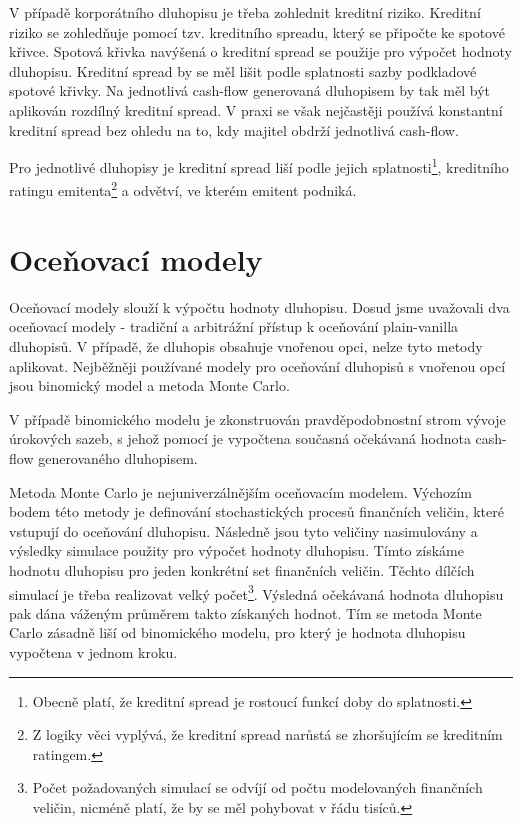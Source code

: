 \documentclass[a4paper]{book}
\begin{document}
V případě korporátního dluhopisu je třeba zohlednit kreditní riziko. Kreditní riziko se zohledňuje pomocí tzv. kreditního spreadu, který se připočte ke spotové křivce. Spotová křivka navýšená o kreditní spread se použije pro výpočet hodnoty dluhopisu. Kreditní spread by se měl lišit podle splatnosti sazby podkladové spotové křivky. Na jednotlivá cash-flow generovaná dluhopisem by tak měl být aplikován rozdílný kreditní spread. V praxi se však nejčastěji používá konstantní kreditní spread bez ohledu na to, kdy majitel obdrží jednotlivá cash-flow.

Pro jednotlivé dluhopisy je kreditní spread liší podle jejich splatnosti\footnote{Obecně platí, že kreditní spread je rostoucí funkcí doby do splatnosti.}, kreditního ratingu emitenta\footnote{Z logiky věci vyplývá, že kreditní spread narůstá se zhoršujícím se kreditním ratingem.} a odvětví, ve kterém emitent podniká.

\section{Oceňovací modely}

Oceňovací modely slouží k výpočtu hodnoty dluhopisu. Dosud jsme uvažovali dva oceňovací modely - tradiční a arbitrážní přístup k oceňování plain-vanilla dluhopisů. V případě, že dluhopis obsahuje vnořenou opci, nelze tyto metody aplikovat. Nejběžněji používané modely pro oceňování dluhopisů s vnořenou opcí jsou binomický model a metoda Monte Carlo.

V případě binomického modelu je zkonstruován pravděpodobnostní strom vývoje úrokových sazeb, s jehož pomocí je vypočtena současná očekávaná hodnota cash-flow generovaného dluhopisem.

Metoda Monte Carlo je nejuniverzálnějším oceňovacím modelem. Výchozím bodem této metody je definování stochastických procesů finančních veličin, které vstupují do oceňování dluhopisu. Následně jsou tyto veličiny nasimulovány a výsledky simulace použity pro výpočet hodnoty dluhopisu. Tímto získáme hodnotu dluhopisu pro jeden konkrétní set finančních veličin.  Těchto dílčích simulací je třeba realizovat velký počet\footnote{Počet požadovaných simulací se odvíjí od počtu modelovaných finančních veličin, nicméně platí, že by se měl pohybovat v řádu tisíců.}. Výsledná očekávaná hodnota dluhopisu pak dána váženým průměrem takto získaných hodnot. Tím se metoda Monte Carlo zásadně liší od binomického modelu, pro který je hodnota dluhopisu vypočtena v jednom kroku.
\end{document}
